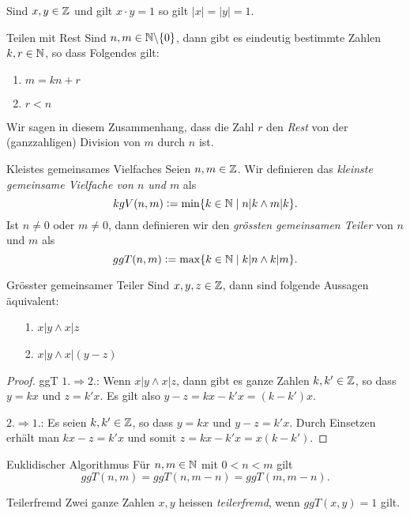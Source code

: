 \begin{remark}\label{Zeinheiten}
Sind $x,y\in\mathbb{Z}$ und gilt $x\cdot y=1$ so gilt $|x|=|y|=1$.
\end{remark}


\begin{lemma}{Teilen mit Rest}
 Sind $n,m\in\mathbb{N}\backslash\{0\}$, dann gibt es eindeutig bestimmte Zahlen $k,r\in\mathbb{N}$, so dass Folgendes gilt:
\begin{enumerate}
\item $m=kn+r$
 \item $r<n$
\end{enumerate}
Wir sagen in diesem Zusammenhang, dass die Zahl $r$ den \textit{Rest} von der (ganzzahligen) Division von $m$ durch $n$ ist.
\end{lemma}

\begin{definition}{Kleistes gemeinsames Vielfaches}
Seien $n,m\in\mathbb{Z}$. Wir definieren das \textit{kleinste gemeinsame Vielfache von $n$ und $m$} als
\[
 kgV(n,m):=\min\{k\in\mathbb{N}\mid n|k\wedge m|k\}.
\]
Ist $n\neq0$ oder $ m\neq 0$, dann definieren wir den \textit{grössten gemeinsamen Teiler} von $n$ und $m$ als
\[
 ggT(n,m):=\max\{k\in\mathbb{N}\mid k|n\wedge k|m\}.
\]
\end{definition}

\begin{lemma}{Grösster gemeinsamer Teiler}
 Sind $x,y,z\in\mathbb{Z}$, dann sind folgende Aussagen äquivalent:
\begin{enumerate}
\item[1.] $ x|y\wedge x|z$
\item[2.] $x|y\wedge x|(y-z) $
\end{enumerate}
\end{lemma}
\begin{proof}{ggT}
 $1.\Rightarrow 2.$: Wenn $x|y\wedge x|z$, dann gibt es ganze Zahlen $k,k'\in\mathbb{Z}$, so dass $y=kx$ und $z=k'x$. Es gilt also $y-z=kx-k'x=(k-k')x$.

$2.\Rightarrow 1.$: Es seien $k,k'\in\mathbb{Z}$, so dass $y=kx$ und $y-z=k'x$. Durch Einsetzen erhält man $ kx-z=k'x $ und somit $z=kx-k'x=x(k-k')$.
\end{proof}

\begin{lemma}{Euklidischer Algorithmus}
 Für $n,m\in\mathbb{N}$ mit $0<n< m$ gilt
\[
 ggT(n,m)=ggT(n,m-n)=ggT(m,m-n).
\]
\end{lemma}


\begin{definition}{Teilerfremd}
 Zwei ganze Zahlen $x,y$ heissen \textit{teilerfremd}, wenn $ggT(x,y)=1$ gilt.
\end{definition}

